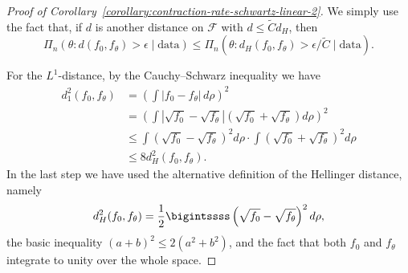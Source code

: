 \begin{proof}[Proof of Corollary~\ref{corollary:contraction-rate-schwartz-linear-2}]\label{proof:contraction-rate-schwartz-linear-2}
We simply use the fact that, if \(d\) is another distance on \(\mathcal F\) with \(d\leq \tilde C d_H\), then
\[
  \Pi_n\left(\theta: d(f_0, f_\theta)>\epsilon\mid \text{data}\right) \leq \Pi_n\left(\theta: d_H(f_0, f_\theta)>\epsilon/\tilde C\mid \text{data}\right).
\]

For the \(L^1\)-distance, by the Cauchy--Schwarz inequality we have
\begin{align*}
  d_1^2(f_0, f_\theta) & = \left(\int |f_0 - f_\theta|\, d\rho\right)^2                                                                          \\
                       & = \left(\int \left|\sqrt{f_0} - \sqrt{f_\theta}\right|\left(\sqrt{f_0} + \sqrt{f_\theta}\right) d\rho\right)^2          \\
                       & \leq \int\left(\sqrt{f_0} - \sqrt{f_\theta}\right)^2 d\rho \cdot \int \left(\sqrt{f_0} + \sqrt{f_\theta}\right)^2 d\rho \\
                       & \leq 8 d^2_H(f_0, f_\theta).
\end{align*}
In the last step we have used the alternative definition of the Hellinger distance, namely 
\[
  d_H^2(f_0, f_\theta) = \frac{1}{2}\bigintssss\left(\sqrt{f_0} - \sqrt{f_\theta}\right)^2 d\rho, 
\] 
the basic inequality \((a + b)^2 \leq 2(a^2 + b^2)\), and the fact that both \(f_0\) and \(f_\theta\) integrate to unity over the whole space.


\end{proof}
